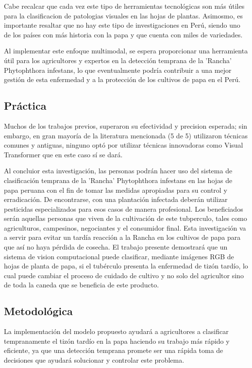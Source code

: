 Cabe recalcar que cada vez este tipo de herramientas tecnológicas son más útiles para la clasificacion de patologias visuales en las hojas de plantas. Asimosmo, es importante resaltar que no hay este tipo de investigaciones en Perú, siendo uno de los países con más historia con la papa y que cuenta con miles de variedades.

Al implementar este enfoque multimodal, se espera proporcionar una herramienta útil para los agricultores y expertos en la detección temprana de la 'Rancha' Phytophthora infestans, lo que eventualmente podría contribuir a una mejor gestión de esta enfermedad y a la protección de los cultivos de papa en el Perú. 
\subsection{Práctica}
Muchos de los trabajos previos, superaron su efectividad y precision esperada; sin embargo, en gran mayoría de la literatura mencionada (5 de 5) utilizaron técnicas comunes y antiguas, ninguno optó por utilizar técnicas innovadoras como Visual Transformer que en este caso sí se dará.


Al concluior esta investigación, las personas podrán hacer uso del sistema de clasificación temprana de la 'Rancha' Phytophthora infestans en las hojas de papa peruana con el fin de tomar las medidas apropiadas para su control y erradicación. De encontrarse, con una plantación infectada deberán utilizar pesticidas especializados para esos casos de manera profesional. Los beneficiados serán aquellas personas que viven de la cultivación de este tubperculo, tales como agriculturos, campesinos, negociantes y el consumidor final. Esta investigación va a servir para evitar un tardía reacción a la Rancha en los cultivos de papa para que así no haya pérdida de cosecha. El trabajo presente demostrará que un sistema de vision computacional puede clasificar, mediante imágenes RGB de hojas de planta de papa, si el tubérculo presenta la enfermedad de tizón tardío, lo cual puede cambiar el proceso de cuidado de cultivo y no solo del agricultor sino de toda la caneda que se beneficia de este producto.

\subsection{Metodológica}
La implementación del modelo propuesto ayudará a agricultores a clasificar tempranamente el tizón tardío en la papa haciendo su trabajo más rápido y eficiente, ya que una detección temprana promete ser una rápida toma de decisiones que ayudará solucionar y controlar este problema.


